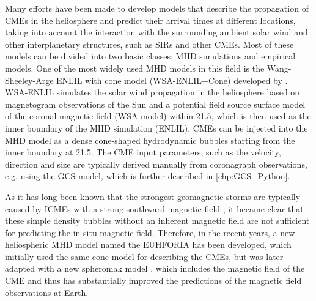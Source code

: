 Many efforts have been made to develop models that describe the propagation of \acp{CME} in the heliosphere and predict their arrival times at different locations, taking into account the interaction with the surrounding ambient solar wind and other interplanetary structures, such as \acp{SIR} and other \acp{CME}. Most of these models can be divided into two basic classes: \ac{MHD} simulations and empirical models. One of the most widely used \ac{MHD} models in this field is the Wang-Sheeley-Arge ENLIL with cone model (WSA-ENLIL+Cone) developed by \citet{Odstrcil-2004}. WSA-ENLIL simulates the solar wind propagation in the heliosphere based on magnetogram observations of the Sun and a potential field source surface model of the coronal magnetic field (WSA model) within \SI{21.5}{\solarradius}, which is then used as the inner boundary of the \ac{MHD} simulation (ENLIL). CMEs can be injected into the \ac{MHD} model as a dense cone-shaped hydrodynamic bubbles starting from the inner boundary at \SI{21.5}{\solarradius}. The CME input parameters, such as the velocity, direction and size are typically derived manually from coronagraph observations, e.g. using the \acl{GCS} \citep[\acs{GCS},][]{Thernisien-2011-GCS} model, which is further described in \autoref{chp:GCS_Python}.

As it has long been known that the strongest geomagnetic storms are typically caused by \acp{ICME} with a strong southward magnetic field \citep[negative $B_z$, see e.g.][]{Russell-1974}, it became clear that these simple density bubbles without an inherent magnetic field are not sufficient for predicting the in situ magnetic field.
Therefore, in the recent years, a new heliospheric \ac{MHD} model named the \acl{EUHFORIA} \citep[\acs{EUHFORIA},][]{Pomoell-2018} has been developed, which initially used the same cone model for describing the \acp{CME}, but was later adapted with a new spheromak model \citep{Scolini-2019}, which includes the magnetic field of the \ac{CME} and thus has substantially improved the predictions of the magnetic field observations at Earth.

